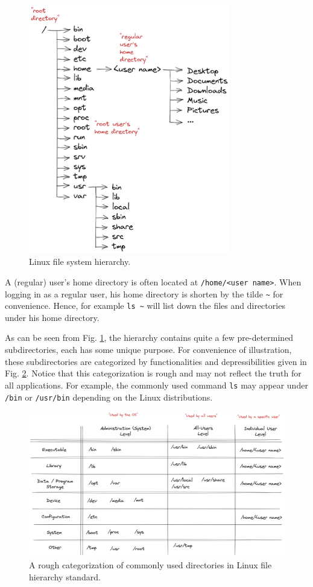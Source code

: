 \begin{figure}
	\centering
	\includegraphics[width=250pt]{chapters/chapter4/figures/linux_file_hierarchy.png}
	\caption{Linux file system hierarchy.} \label{ch4fig:hierarchy}
\end{figure}

A (regular) user's home directory is often located at \verb|/home/<user name>|. When logging in as a regular user, his home directory is shorten by the tilde \verb|~| for convenience. Hence, for example \verb|ls ~| will list down the files and directories under his home directory.

As can be seen from Fig. \ref{ch4fig:hierarchy}, the hierarchy contains quite a few pre-determined subdirectories, each has some unique purpose. For convenience of illustration, these subdirectories are categorized by functionalities and depressibilities given in Fig. \ref{ch4fig:directorycate}. Notice that this categorization is rough and may not reflect the truth for all applications. For example, the commonly used command \verb|ls| may appear under \verb|/bin| or \verb|/usr/bin| depending on the Linux distributions.

\begin{figure}
	\centering
	\includegraphics[width=350pt]{chapters/chapter4/figures/linux_directory_cate.png}
	\caption{A rough categorization of commonly used directories in Linux file hierarchy standard.} \label{ch4fig:directorycate}
\end{figure}

